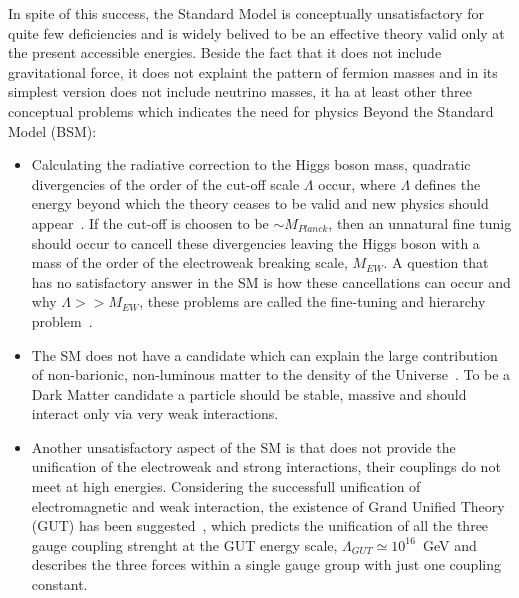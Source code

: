 In spite of this success, the Standard Model is conceptually unsatisfactory for quite few deficiencies and is
widely belived to be an effective theory valid only at the present accessible energies. Beside the fact that 
it does not  include  gravitational force, it does not explaint the pattern of fermion masses and in its simplest 
version does not include neutrino masses, it ha at least other three conceptual problems which indicates the need 
for physics Beyond the Standard Model (BSM):
\begin{itemize}
\item Calculating the radiative correction to the Higgs boson mass, quadratic divergencies of the order  
	of the cut-off scale $\Lambda$ occur, where  $\Lambda$ defines  the energy
	beyond which the theory ceases to be valid and new physics should appear~\cite{Djuadi4}. If the cut-off is choosen 
	to be $\sim M_{Planck}$, then an 
	unnatural fine tunig should occur to cancell these divergencies leaving the Higgs boson with a mass of the order of the electroweak breaking scale, $M_{EW}$.
	A question that has no satisfactory answer in the SM is how these cancellations can occur and why $\Lambda >> M_{EW}$, these problems are
	called the fine-tuning and hierarchy problem~\cite{Hierarchy1,Hierarchy2,Hierarchy3}.

\item   The SM does not have a candidate which can explain the large contribution 
	of non-barionic, non-luminous matter to the density of the Universe~\cite{darkmatter1,darkmatter2,darkmatter3}. To be a Dark Matter candidate a particle should be
	stable, massive and should interact only via very weak interactions. 

\item Another unsatisfactory aspect of the SM is that does not provide the unification of the electroweak and strong interactions,
	their couplings do not meet at high energies. Considering the successfull unification of electromagnetic and weak
	interaction, the existence of Grand Unified Theory (GUT) has been 
	suggested~\cite{GUT1,GUT2}, which predicts the unification of all the three gauge coupling strenght at the GUT energy scale,
	$\Lambda_{GUT} \simeq 10^{16}$~GeV and describes the three forces within a single gauge group with just one coupling constant.

\end{itemize}
